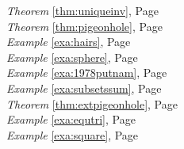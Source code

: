 \begin{multicols}{3}
\begin{center}
      \textit{Theorem} \ref{thm:uniqueinv}, Page \pageref{thm:uniqueinv} \\
      \textit{Theorem} \ref{thm:pigeonhole}, Page \pageref{thm:pigeonhole} \\
      \textit{Example} \ref{exa:hairs}, Page \pageref{exa:hairs} \\
      \textit{Example} \ref{exa:sphere}, Page \pageref{exa:sphere} \\
      \textit{Example} \ref{exa:1978putnam}, Page \pageref{exa:1978putnam} \\
      \textit{Example} \ref{exa:subsetssum}, Page \pageref{exa:subsetssum} \\
      \textit{Theorem} \ref{thm:extpigeonhole}, Page \pageref{thm:extpigeonhole} \\
      \textit{Example} \ref{exa:equtri}, Page \pageref{exa:equtri} \\
      \textit{Example} \ref{exa:square}, Page \pageref{exa:square} \\
   \end{center}
\end{multicols}